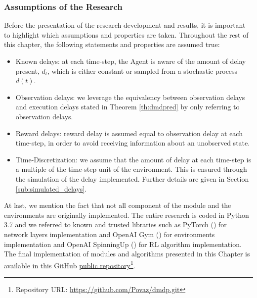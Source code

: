         \subsubsection{Assumptions of the Research}
            Before the presentation of the research development and results, it is important to highlight which assumptions and properties are taken. Throughout the rest of this chapter, the following statements and properties are assumed true:
            \begin{itemize}
                \setlength\itemsep{0.05em}
                \item Known delays: at each time-step, the Agent is aware of the amount of delay present, $d_t$, which is either constant or sampled from a stochastic process $d(t)$.
                \item Observation delays: we leverage the equivalency between observation delays and execution delays stated in Theorem \ref{th:dmdpred} by only referring to observation delays.
                \item Reward delays: reward delay is assumed equal to observation delay at each time-step, in order to avoid receiving information about an unobserved state.
                \item Time-Discretization: we assume that the amount of delay at each time-step is a multiple of the time-step unit of the environment. This is ensured through the simulation of the delay implemented. Further details are given in Section \ref{sub:simulated_delays}.
            \end{itemize}
            At last, we mention the fact that not all component of the module and the environments are originally implemented. The entire research is coded in Python 3.7 and we referred to known and trusted libraries such as PyTorch () for network layers implementation and OpenAI Gym () for environments implementation and OpenAI SpinningUp () for RL algorithm implementation. The final implementation of modules and algorithms presented in this Chapter is available in this GitHub \href{https://github.com/Povaz/dmdp.git}{public repository}\footnote{Repository URL: \url{https://github.com/Povaz/dmdp.git}}.
            
